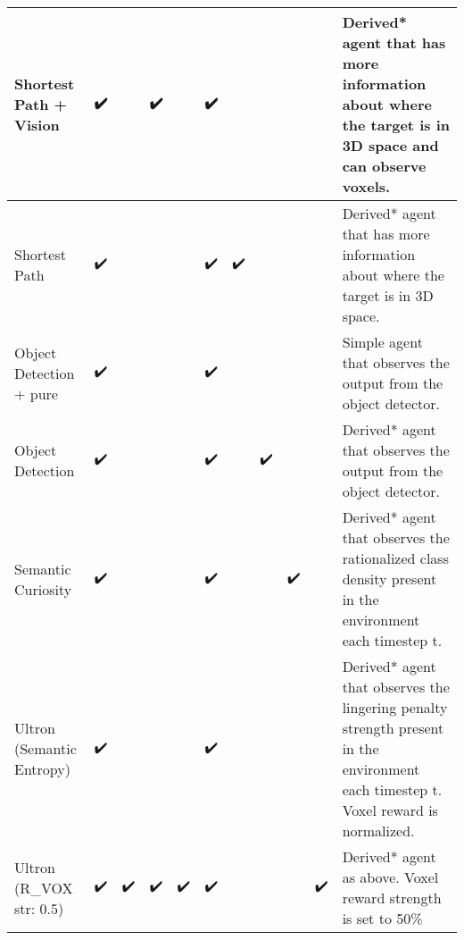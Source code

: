 {\begin{landscape}
\begin{table}[]
{\begin{tabular}{l|ccccccccc|l}
        \multicolumn{1}{|l|}{Shortest Path + Vision} & \multicolumn{1}{c|}{✔️} & \multicolumn{1}{c|}{} & \multicolumn{1}{c|}{✔️} & \multicolumn{1}{c|}{} & \multicolumn{1}{c|}{✔️} & \multicolumn{1}{c|}{} & \multicolumn{1}{c|}{} & \multicolumn{1}{c|}{} &  & \multicolumn{1}{l|}{Derived* agent that has more information about where the target is in 3D space and can observe voxels.} \\ \hline
        \multicolumn{1}{|l|}{Shortest Path} & \multicolumn{1}{c|}{✔️} & \multicolumn{1}{c|}{} & \multicolumn{1}{c|}{} & \multicolumn{1}{c|}{} & \multicolumn{1}{c|}{✔️} & \multicolumn{1}{c|}{✔️} & \multicolumn{1}{c|}{} & \multicolumn{1}{c|}{} &  & \multicolumn{1}{l|}{Derived* agent that has more information about where the target is in 3D space.} \\ \hline
        \multicolumn{1}{|l|}{Object Detection + pure} & \multicolumn{1}{c|}{✔️} & \multicolumn{1}{c|}{} & \multicolumn{1}{c|}{} & \multicolumn{1}{c|}{} & \multicolumn{1}{c|}{✔️} & \multicolumn{1}{c|}{} & \multicolumn{1}{c|}{} & \multicolumn{1}{c|}{} &  & \multicolumn{1}{l|}{Simple agent that observes the output from the object detector.} \\ \hline
        \multicolumn{1}{|l|}{Object Detection} & \multicolumn{1}{c|}{✔️} & \multicolumn{1}{c|}{} & \multicolumn{1}{c|}{} & \multicolumn{1}{c|}{} & \multicolumn{1}{c|}{✔️} & \multicolumn{1}{c|}{} & \multicolumn{1}{c|}{✔️} & \multicolumn{1}{c|}{} &  & \multicolumn{1}{l|}{Derived* agent that observes the output from the object detector.} \\ \hline
        \multicolumn{1}{|l|}{Semantic Curiosity} & \multicolumn{1}{c|}{✔️} & \multicolumn{1}{c|}{} & \multicolumn{1}{c|}{} & \multicolumn{1}{c|}{} & \multicolumn{1}{c|}{✔️} & \multicolumn{1}{c|}{} & \multicolumn{1}{c|}{} & \multicolumn{1}{c|}{✔️} &  & \multicolumn{1}{l|}{Derived* agent that observes the rationalized class density present in the environment each timestep t.} \\ \hline
        \multicolumn{1}{|l|}{Ultron (Semantic Entropy)} & \multicolumn{1}{c|}{✔️} & \multicolumn{1}{c|}{} & \multicolumn{1}{c|}{} & \multicolumn{1}{c|}{} & \multicolumn{1}{c|}{✔️} & \multicolumn{1}{c|}{} & \multicolumn{1}{c|}{} & \multicolumn{1}{c|}{} &  & \multicolumn{1}{l|}{Derived* agent that observes the lingering penalty strength present in the environment each timestep t. Voxel reward is normalized.} \\ \hline
        \multicolumn{1}{|l|}{Ultron (R\_VOX str: 0.5)} & \multicolumn{1}{c|}{✔️} & \multicolumn{1}{c|}{✔️} & \multicolumn{1}{c|}{✔️} & \multicolumn{1}{c|}{✔️} & \multicolumn{1}{c|}{✔️} & \multicolumn{1}{c|}{} & \multicolumn{1}{c|}{} & \multicolumn{1}{c|}{} & ✔️ & \multicolumn{1}{l|}{Derived* agent as above. Voxel reward strength is set to 50\%} \\ \hline

\end{tabular}}
\end{table}
\end{landscape}}
